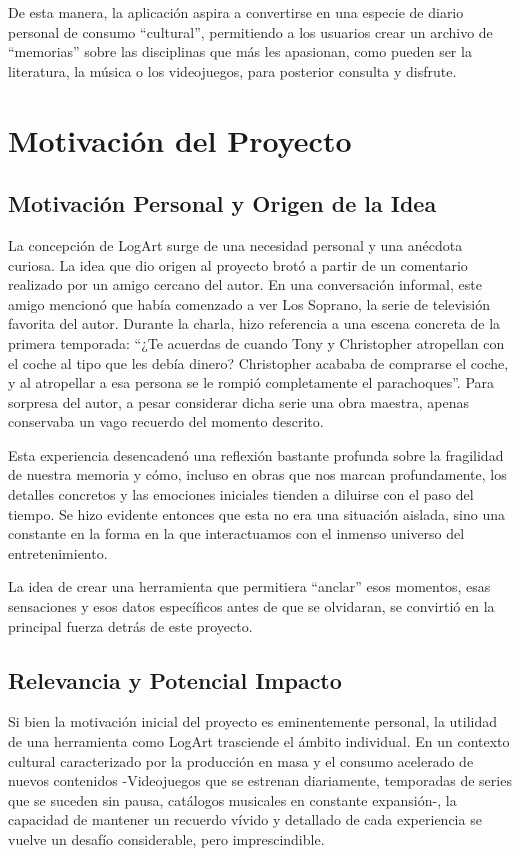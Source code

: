 De esta manera, la aplicación aspira a convertirse en una especie de diario personal de consumo ``cultural'', permitiendo a los usuarios crear un archivo de ``memorias'' sobre las disciplinas que más les apasionan, como pueden ser la literatura, la música o los videojuegos, para posterior consulta y disfrute.

\section{Motivación del Proyecto}

\subsection{Motivación Personal y Origen de la Idea}

La concepción de LogArt surge de una necesidad personal y una anécdota curiosa. La idea que dio origen al proyecto brotó a partir de un comentario realizado por un amigo cercano del autor. En una conversación informal, este amigo mencionó que había comenzado a ver Los Soprano, la serie de televisión favorita del autor. Durante la charla, hizo referencia a una escena concreta de la primera temporada: ``¿Te acuerdas de cuando Tony y Christopher atropellan con el coche al tipo que les debía dinero? Christopher acababa de comprarse el coche, y al atropellar a esa persona se le rompió completamente el parachoques''. Para sorpresa del autor, a pesar considerar dicha serie una obra maestra, apenas conservaba un vago recuerdo del momento descrito.

Esta experiencia desencadenó una reflexión bastante profunda sobre la fragilidad de nuestra memoria y cómo, incluso en obras que nos marcan profundamente, los detalles concretos y las emociones iniciales tienden a diluirse con el paso del tiempo. Se hizo evidente entonces que esta no era una situación aislada, sino una constante en la forma en la que interactuamos con el inmenso universo del entretenimiento.

La idea de crear una herramienta que permitiera ``anclar'' esos momentos, esas sensaciones y esos datos específicos antes de que se olvidaran, se convirtió en la principal fuerza detrás de este proyecto.

\subsection{Relevancia y Potencial Impacto}

Si bien la motivación inicial del proyecto es eminentemente personal, la utilidad de una herramienta como LogArt trasciende el ámbito individual. En un contexto cultural caracterizado por la producción en masa y el consumo acelerado de nuevos contenidos -Videojuegos que se estrenan diariamente\cite{xatakaSaturacionVideojuegos}, temporadas de series que se suceden sin pausa, catálogos musicales en constante expansión-, la capacidad de mantener un recuerdo vívido y detallado de cada experiencia se vuelve un desafío considerable, pero imprescindible.

